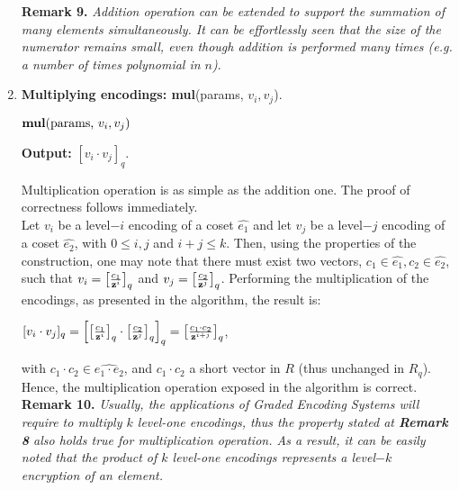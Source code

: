\begin{enumerate}[label=(\alph*)]
\textbf{Remark 9.} \textit{Addition operation can be extended to support the summation of many elements simultaneously. It can be effortlessly seen that the size of the numerator remains small, even though addition is performed many times (e.g. a number of times polynomial in $n$)}.\\


\item \textbf{Multiplying encodings: mul}(params, $v_i, v_j$).

\begin{tcolorbox}[colframe=black,colback=white,arc=0pt,outer arc=0pt]
	\begin{center}
		$\text{\textbf{mul}(params, } v_i, v_j)$
	\end{center}
	\begin{algorithmic}[1]
		\State \textbf{Output:} $[v_i \cdot v_j]_q$.
	\end{algorithmic}
\end{tcolorbox}

Multiplication operation is as simple as the addition one. The proof of correctness follows immediately.\\
Let $v_i$ be a level$-i$ encoding of a coset $\widehat{e_1}$ and let $v_j$ be a level$-j$ encoding of a coset $\widehat{e_2}$, with $0 \leq i, j$ and $i + j \leq k$. Then, using the properties of the construction, one may note that there must exist two vectors, $c_1 \in \widehat{e_1}, c_2 \in \widehat{e_2}$, such that $v_i = \big[ \frac{c_1}{\textbf{z}^i}\big]_q$ and  $v_j = \big[ \frac{c_2}{\textbf{z}^j}\big]_q$. Performing the multiplication of the encodings, as presented in the algorithm, the result is:

\begin{center}
	$[v_i \cdot v_j]_q = \Big[ \big[ \frac{c_1}{\textbf{z}^i}\big]_q \cdot \big[ \frac{c_2}{\textbf{z}^j}\big]_q\Big]_q = \big[ \frac{c_1 \cdot c_2}{\textbf{z}^{i+j}} \big]_q$,
\end{center}

with $c_1 \cdot c_2 \in \widehat{e_1 \cdot e_2}$, and $c_1 \cdot c_2$ a short vector in $R$ (thus unchanged in $R_q$). Hence, the multiplication operation exposed in the algorithm is correct.\\

\textbf{Remark 10.}  \textit{Usually, the applications of Graded Encoding Systems will require to multiply $k$ level-one encodings, thus the property stated at \textbf{Remark 8} also holds true for multiplication operation. As a result, it can be easily noted that the product of $k$ level-one encodings represents a level$-k$ encryption of an element.}\\


\end{enumerate}
